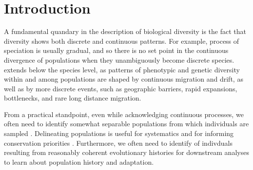 \documentclass[12pt]{article}
\newcommand{\gc}[1]{{\it\color{blue}{(#1)}}}
\begin{document}
\newpage
\section*{Introduction}
A fundamental quandary in the description of biological diversity is
the fact that diversity shows both discrete and continuous patterns. 
For example, \gc{reasonable people can disagree whether two
  populations are separate species, because the} %
process of speciation is usually gradual, and so there is no set point
in the continuous divergence of populations when they unambiguously become discrete species.
\gc{The issue of identifying meaningful biological subunits} extends below the species level, as patterns of phenotypic
and genetic diversity within and among populations are shaped
by continuous migration and drift, as well as by more discrete events, 
such as geographic barriers, rapid expansions, bottlenecks, and rare
long distance migration. 

From a practical standpoint, even while acknowledging continuous
processes, we often need to identify somewhat separable populations 
from which individuals are sampled \citep{wright1949genetical}.
Delineating populations is useful for systematics and for
informing conservation priorities \citep{Moritz1994,Waples_1998,Moritz_etal_2002}.
Furthermore, we often need to identify \gc{subsets} of indivduals resulting from reasonably coherent
evolutionary histories for downstream analyses to learn about population history and adaptation. 
\end{document}
